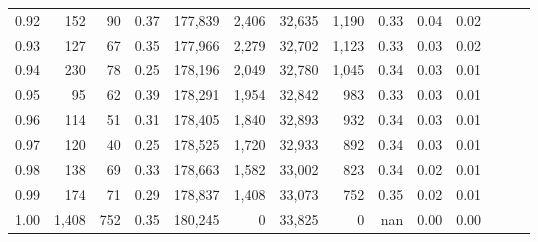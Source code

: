 \begin{tabular}{rrrrrrrrrrrrrr}
0.92 &    152 &   90 &  0.37 &  177,839 &    2,406 &  32,635 &   1,190 &  0.33 &  0.04 &      0.02 \\
0.93 &    127 &   67 &  0.35 &  177,966 &    2,279 &  32,702 &   1,123 &  0.33 &  0.03 &      0.02 \\
0.94 &    230 &   78 &  0.25 &  178,196 &    2,049 &  32,780 &   1,045 &  0.34 &  0.03 &      0.01 \\
0.95 &     95 &   62 &  0.39 &  178,291 &    1,954 &  32,842 &     983 &  0.33 &  0.03 &      0.01 \\
0.96 &    114 &   51 &  0.31 &  178,405 &    1,840 &  32,893 &     932 &  0.34 &  0.03 &      0.01 \\
0.97 &    120 &   40 &  0.25 &  178,525 &    1,720 &  32,933 &     892 &  0.34 &  0.03 &      0.01 \\
0.98 &    138 &   69 &  0.33 &  178,663 &    1,582 &  33,002 &     823 &  0.34 &  0.02 &      0.01 \\
0.99 &    174 &   71 &  0.29 &  178,837 &    1,408 &  33,073 &     752 &  0.35 &  0.02 &      0.01 \\
1.00 &  1,408 &  752 &  0.35 &  180,245 &        0 &  33,825 &       0 &   nan &  0.00 &      0.00 \\
\bottomrule
\end{tabular}
